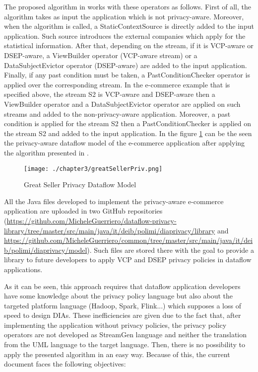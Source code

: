 The proposed algorithm in \cite{privacypoliciesarticle} works with these operators as follows. First of all, the algorithm takes as input the application which is not privacy-aware. Moreover, when the algorithm is called, a StaticContextSource is directly added to the input application. Such source introduces the external companies which apply for the statistical information. After that, depending on the stream, if it is VCP-aware or DSEP-aware, a ViewBuilder operator (VCP-aware stream) or a DataSubjectEvictor operator (DSEP-aware) are added to the input application. Finally, if any past condition must be taken, a PastConditionChecker operator is applied over the corresponding stream. In the e-commerce example that is specified above, the stream S2 is VCP-aware and DSEP-aware then a ViewBuilder operator and a DataSubjectEvictor operator are applied on such streams and added to the non-privacy-aware application. Moreover, a past condition is applied for the stream S2 then a PastConditionChecker is applied on the stream S2 and added to the input application. In the figure \ref{fig:Great Seller Privacy Dataflow Model} can be the seen the privacy-aware dataflow model of the e-commerce application after applying the algorithm presented in \cite{privacypoliciesarticle}.

\begin{figure}
\centering
{\texttt{[image: ./chapter3/greatSellerPriv.png]}}
\caption{Great Seller Privacy Dataflow Model}
\label{fig:Great Seller Privacy Dataflow Model}
\end{figure}

All the Java files developed to implement the privacy-aware e-commerce application are uploaded in two GitHub repositories (\url{https://github.com/MicheleGuerriero/dataflow-privacy-library/tree/master/src/main/java/it/deib/polimi/diaprivacy/library} and \url{https://github.com/MicheleGuerriero/common/tree/master/src/main/java/it/deib/polimi/diaprivacy/model}). Such files are stored there with the goal to provide a library to future developers to apply VCP and DSEP privacy policies in dataflow applications.

As it can be seen, this approach requires that dataflow application developers have some knowledge about the privacy policy language but also about the targeted platform language (Hadoop, Spark, Flink...) which supposes a loss of speed to design DIAs. These inefficiencies are given due to the fact that, after implementing the application without privacy policies, the privacy policy operators are not developed as StreamGen language and neither the translation from the UML language to the target language. Then, there is no possibility to apply the presented algorithm in an easy way. Because of this, the current document faces the following objectives:

